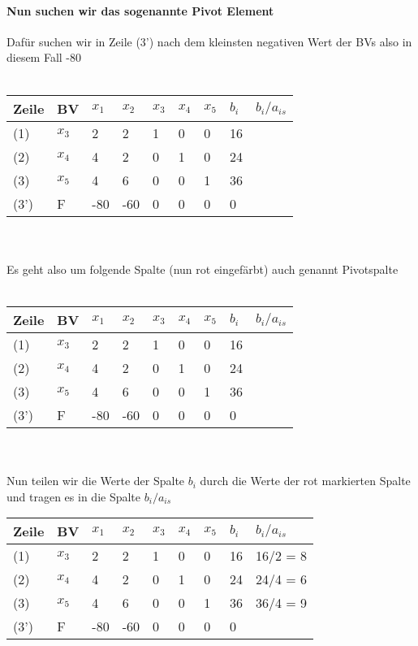 \documentclass{article}
\begin{document}
\paragraph{Nun suchen wir das sogenannte Pivot Element}
Dafür suchen wir in Zeile (3') nach dem kleinsten negativen Wert der BVs also in diesem Fall -80\\\\
\begin{tabular}{|l|l|l|l|l|l|l|l|l|}
	\hline
	Zeile & BV & $x_{1}$&$x_{2}$&$x_{3}$&$x_{4}$&$x_{5}$&$b_{i}$&$b_{i}/a_{is}$\\
	\hline
	(1)&$x_{3}$&2&2&1&0&0&16& \\
	\hline
	(2)&$x_{4}$&4&2&0&1&0&24& \\
	\hline
	(3)&$x_{5}$&4&6&0&0&1&36& \\
	\hline
	(3')&F&\cellcolor{red}-80&-60&0&0&0&0&\\
	\hline
\end{tabular}\\\\
Es geht also um folgende Spalte (nun rot eingefärbt) auch genannt Pivotspalte\\\\
\begin{tabular}{|l|l|l|l|l|l|l|l|l|}
	\hline
	Zeile & BV & $x_{1}$&$x_{2}$&$x_{3}$&$x_{4}$&$x_{5}$&$b_{i}$&$b_{i}/a_{is}$\\
	\hline
	(1)&$x_{3}$&\cellcolor{red}2&2&1&0&0&16& \\
	\hline
	(2)&$x_{4}$&\cellcolor{red}4&2&0&1&0&24& \\
	\hline
	(3)&$x_{5}$&\cellcolor{red}4&6&0&0&1&36& \\
	\hline
	(3')&F&\cellcolor{red}-80&-60&0&0&0&0&\\
	\hline
\end{tabular}\\\\
Nun teilen wir die Werte der Spalte $b_{i}$ durch die Werte der rot markierten Spalte und tragen es in die Spalte $b_{i}/a_{is}$\\ 
\begin{tabular}{|l|l|l|l|l|l|l|l|l|}
	\hline
	Zeile & BV & $x_{1}$&$x_{2}$&$x_{3}$&$x_{4}$&$x_{5}$&$b_{i}$&$b_{i}/a_{is}$\\
	\hline
	(1)&$x_{3}$&\cellcolor{red}2&2&1&0&0&16&16/2 = 8\\
	\hline
	(2)&$x_{4}$&\cellcolor{red}4&2&0&1&0&24&24/4 = 6\\
	\hline
	(3)&$x_{5}$&\cellcolor{red}4&6&0&0&1&36&36/4 = 9\\
	\hline
	(3')&F&\cellcolor{red}-80&-60&0&0&0&0&\\
	\hline
\end{tabular}\\\\
\end{document}
